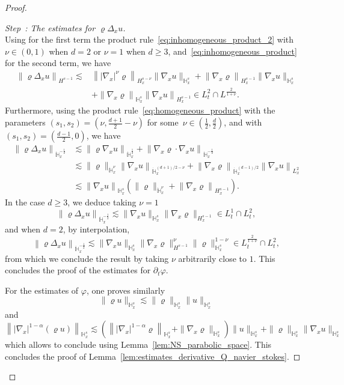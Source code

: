 \documentclass[AHL,Unicode,longabstracts,published]{cedram}
\newcommand{\bbH}{\mathbb{H}}
\renewcommand*\ge{\geqslant}
\newcounter{stepcount}
\newenvironment{step}[1]{\refstepcounter{stepcount}\begin{proof}[Step~\thestepcount: #1]}{\let\qed\relax\end{proof}}
\begin{document}
\begin{proof}
\begin{step}{{The estimates for $\varrho \Delta_x u$}}
\[\]
Using for the first term the product rule~\eqref{eq:inhomogeneous_product_2} with $\nu \in (0, 1)$ when $d = 2$ or $\nu = 1$ when $d \ge 3$, and~\eqref{eq:inhomogeneous_product} for the second term, we have
\begin{align*}
\left\| \varrho \Delta_x u \right\|_{H^{s-1} } \lesssim &
\left\| | \nabla_x |^\nu \varrho \right\|_{H^{s-\nu}_x} \| \nabla_x u \|_{\bbH^s_x} + \left\| \nabla_x \varrho \right\|_{H^{s-1}_x} \| \nabla_x u \|_{\bbH^s_x} \\
& + \left\| \nabla_x \varrho \right\|_{\bbH^s_x} \left\| \nabla_x u \right\|_{H^{s-1}_x} \in L^2_t \cap L^{ \frac{2}{1 + \nu } }.
\end{align*}
Furthermore, using the product rule~\eqref{eq:homogeneous_product} with the parameters $(s_1, s_2) = (\nu, \frac{ d + 1 }{2} - \nu)$ for some~$\nu \in (\frac{1}{2}, \frac{d}{2})$, and with $(s_1, s_2) = (\frac{d-1}{2}, 0)$, we have
\begin{align*}
\left\| \varrho \Delta_x u \right\|_{ \dot{\bbH}^{-\frac{1}{2}}_x } & \lesssim \left\| \varrho \nabla_x u \right\|_{ \dot{\bbH}^{\frac{1}{2}}_x } + \left\| \nabla_x \varrho \cdot \nabla_x u \right\|_{ \dot{\bbH}^{-\frac{1}{2}}_x } \\
& \lesssim \| \varrho \|_{ \dot{\bbH}^{\nu}_x } \left\| \nabla_x u \right\|_{ \dot{\bbH}^{(d+1)/2 - \nu}_x } + \left\| \nabla_x \varrho \right\|_{ \dot{\bbH}^{(d-1)/2 }_x } \left\| \nabla_x u \right\|_{ L^2_x } \\
& \lesssim\left \| \nabla_x u \right\|_{\bbH^s_x} \left(\| \varrho \|_{ \dot{\bbH}^\nu_x } + \left\| \nabla_x \varrho \right\|_{ H^{s-1}_x } \right).
\end{align*}
In the case $d \ge 3$, we deduce taking $\nu = 1$
\[
\left\| \varrho \Delta_x u \right\|_{ \dot{\bbH}^{-\frac{1}{2}}_x } \lesssim \| \nabla_x u \|_{\bbH^s_x} \| \nabla_x \varrho \|_{ H^{s-1}_x } \in L^1_t \cap L^2_t,
\]
and when $d = 2$, by interpolation,
\[
\left\| \varrho \Delta_x u \right\|_{ \dot{\bbH}^{-\frac{1}{2}}_x } \lesssim \| \nabla_x u \|_{\bbH^s_x} \| \nabla_x \varrho \|_{ H^{s-1} }^\nu \| \varrho \|_{ \bbH^s_x }^{1-\nu} \in L^{\frac{2}{1+\nu}}_t \cap L^2_t,
\]
from which we conclude the result by taking $\nu$ arbitrarily close to $1$. This concludes the proof of the estimates for $\partial_t \varphi$.

For the estimates of $\varphi$, one proves similarly
\[
\| \varrho u \|_{ \bbH^s_x } \lesssim \| \varrho \|_{ \bbH^s_x } \| u \|_{ \bbH^s_x }
\]
and
\[
\left\| | \nabla_x |^{1 - \alpha} (\varrho u) \right\|_{ \bbH^s_x } \lesssim \left(\left\| | \nabla_x |^{1 - \alpha} \varrho \right\|_{ \bbH^s_x } + \| \nabla_x \varrho \|_{ \bbH^s_x } \right) \| u \|_{ \bbH^s_x } + \| \varrho \|_{ \bbH^s_x } \| \nabla_x u \|_{ \bbH^s_x }
\]
which allows to conclude using Lemma~\ref{lem:NS_parabolic_space}. This concludes the proof of Lemma~\ref{lem:estimates_derivative_Q_navier_stokes}.\qedhere
\end{step}\let\qed\relax
\end{proof}
\end{document}
